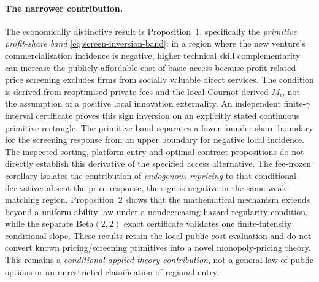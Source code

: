 \paragraph{The narrower contribution.}
The economically distinctive result is Proposition~1, specifically the \emph{primitive profit-share band} \eqref{eq:screen-inversion-band}: in a region where the new venture's commercialisation incidence is negative, higher technical skill complementarity can increase the publicly affordable cost of basic access because profit-related price screening excludes firms from socially valuable direct services. The condition is derived from reoptimised private fees and the local Cournot-derived $M_i$, not the assumption of a positive local innovation externality. An independent finite-$\gamma$ interval certificate proves this sign inversion on an explicitly stated continuous primitive rectangle. The primitive band separates a lower founder-share boundary for the screening response from an upper boundary for negative local incidence. The inspected sorting, platform-entry and optimal-contract propositions do not directly establish this derivative of the specified access alternative. The fee-frozen corollary isolates the contribution of \emph{endogenous repricing} to that conditional derivative: absent the price response, the sign is negative in the same weak-matching region. Proposition~2 shows that the mathematical mechanism extends beyond a uniform ability law under a nondecreasing-hazard regularity condition, while the separate Beta$(2,2)$ exact certificate validates one finite-intensity conditional slope. These results retain the local public-cost evaluation and do not convert known pricing/screening primitives into a novel monopoly-pricing theory. This remains a \emph{conditional applied-theory contribution}, not a general law of public options or an unrestricted classification of regional entry.

